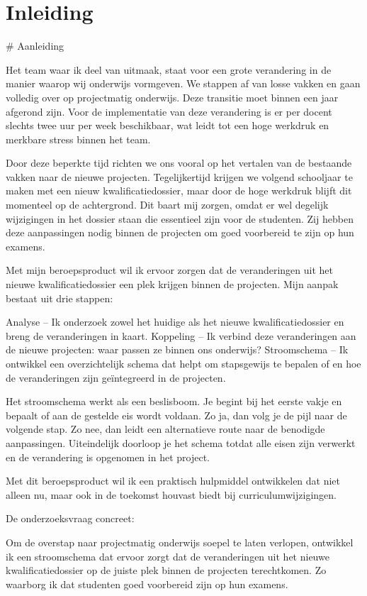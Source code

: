 \chapter{Inleiding}
# Aanleiding

Het team waar ik deel van uitmaak, staat voor een grote verandering in de manier waarop wij onderwijs vormgeven. We stappen af van losse vakken en gaan volledig over op projectmatig onderwijs. Deze transitie moet binnen een jaar afgerond zijn. Voor de implementatie van deze verandering is er per docent slechts twee uur per week beschikbaar, wat leidt tot een hoge werkdruk en merkbare stress binnen het team.

Door deze beperkte tijd richten we ons vooral op het vertalen van de bestaande vakken naar de nieuwe projecten. Tegelijkertijd krijgen we volgend schooljaar te maken met een nieuw kwalificatiedossier, maar door de hoge werkdruk blijft dit momenteel op de achtergrond. Dit baart mij zorgen, omdat er wel degelijk wijzigingen in het dossier staan die essentieel zijn voor de studenten. Zij hebben deze aanpassingen nodig binnen de projecten om goed voorbereid te zijn op hun examens.

Met mijn beroepsproduct wil ik ervoor zorgen dat de veranderingen uit het nieuwe kwalificatiedossier een plek krijgen binnen de projecten. Mijn aanpak bestaat uit drie stappen:

    Analyse – Ik onderzoek zowel het huidige als het nieuwe kwalificatiedossier en breng de veranderingen in kaart.
    Koppeling – Ik verbind deze veranderingen aan de nieuwe projecten: waar passen ze binnen ons onderwijs?
    Stroomschema – Ik ontwikkel een overzichtelijk schema dat helpt om stapsgewijs te bepalen of en hoe de veranderingen zijn geïntegreerd in de projecten.

Het stroomschema werkt als een beslisboom. Je begint bij het eerste vakje en bepaalt of aan de gestelde eis wordt voldaan. Zo ja, dan volg je de pijl naar de volgende stap. Zo nee, dan leidt een alternatieve route naar de benodigde aanpassingen. Uiteindelijk doorloop je het schema totdat alle eisen zijn verwerkt en de verandering is opgenomen in het project.

Met dit beroepsproduct wil ik een praktisch hulpmiddel ontwikkelen dat niet alleen nu, maar ook in de toekomst houvast biedt bij curriculumwijzigingen.

 
De onderzoeksvraag concreet: 
\begin{displayquote}    
    Om de overstap naar projectmatig onderwijs soepel te laten verlopen, ontwikkel ik een stroomschema dat ervoor zorgt dat de veranderingen uit het nieuwe kwalificatiedossier op de juiste plek binnen de projecten terechtkomen. Zo waarborg ik dat studenten goed voorbereid zijn op hun examens. 
\end{displayquote}


